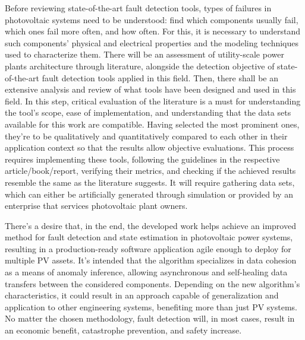 Before reviewing state-of-the-art fault detection tools, types of failures in photovoltaic systems need to be understood: find which components usually fail, which ones fail more often, and how often. For this, it is necessary to understand such components' physical and electrical properties and the modeling techniques used to characterize them. There will be an assessment of utility-scale power plants architecture through literature, alongside the detection objective of state-of-the-art fault detection tools applied in this field. Then, there shall be an extensive analysis and review of what tools have been designed and used in this field. In this step, critical evaluation of the literature is a must for understanding the tool's scope, ease of implementation, and understanding that the data sets available for this work are compatible. Having selected the most prominent ones, they're to be qualitatively and quantitatively compared to each other in their application context so that the results allow objective evaluations. This process requires implementing these tools, following the guidelines in the respective article/book/report, verifying their metrics, and checking if the achieved results resemble the same as the literature suggests. It will require gathering data sets, which can either be artificially generated through simulation or provided by an enterprise that services photovoltaic plant owners.


There's a desire that, in the end, the developed work helps achieve an improved method for fault detection and state estimation in photovoltaic power systems, resulting in a production-ready software application agile enough to deploy for multiple PV assets. It's intended that the algorithm specializes in data cohesion as a means of anomaly inference, allowing asynchronous and self-healing data transfers between the considered components. Depending on the new algorithm's characteristics, it could result in an approach capable of generalization and application to other engineering systems, benefiting more than just PV systems. No matter the chosen methodology, fault detection will, in most cases, result in an economic benefit, catastrophe prevention, and safety increase.